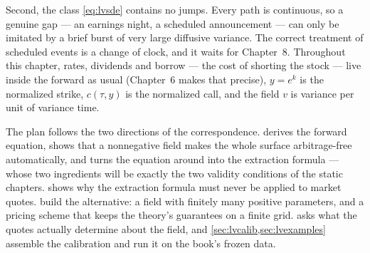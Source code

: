 Second, the class \eqref{eq:lvsde} contains no jumps.  Every path is
continuous, so a genuine gap --- an earnings night, a scheduled
announcement --- can only be imitated by a brief burst of very large
diffusive variance.  The correct treatment of scheduled events is a
change of clock, and it waits for Chapter~8.  Throughout this chapter,
rates, dividends and borrow --- the cost of shorting the stock ---
live inside the forward as usual
(Chapter~6 makes that precise), $y=e^{k}$ is the normalized strike,
$c(\tau,y)$ is the normalized call, and the field $v$ is variance per
unit of variance time.

The plan follows the two directions of the correspondence.
 derives the forward equation, shows that a nonnegative
field makes the whole surface arbitrage-free automatically, and turns
the equation around into the extraction formula --- whose two
ingredients will be exactly the two validity conditions of the static
chapters.   shows why the extraction formula must
never be applied to market quotes.  
build the alternative: a field with finitely many positive parameters,
and a pricing scheme that keeps the theory's guarantees on a finite
grid.   asks what the quotes actually determine about
the field, and \cref{sec:lvcalib,sec:lvexamples} assemble the
calibration and run it on the book's frozen data.
